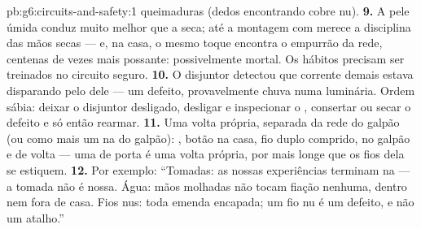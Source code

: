 \begin{solution}{pb:g6:circuits-and-safety:1}
queimaduras (dedos encontrando cobre nu).
\textbf{9.} A pele úmida conduz muito melhor que a seca; até a
montagem com  merece a disciplina das mãos secas --- e, na casa,
o mesmo toque encontra o empurrão da rede, centenas de vezes mais
possante: possivelmente mortal. Os hábitos precisam ser treinados no
circuito seguro.
\textbf{10.} O disjuntor detectou que corrente demais estava
disparando pelo  dele --- um defeito, provavelmente chuva numa
luminária. Ordem sábia: deixar o disjuntor desligado, desligar e
inspecionar o , consertar ou secar o defeito e só então rearmar.
\textbf{11.} Uma volta própria, separada da rede do galpão (ou como
mais um   na  do galpão): , botão na casa,
fio duplo comprido,  no galpão e de volta --- uma 
de porta é uma volta  própria, por mais longe que os fios
dela se estiquem.
\textbf{12.} Por exemplo: ``Tomadas: as nossas experiências terminam
na  --- a tomada não é nossa. Água: mãos molhadas não tocam
fiação nenhuma, dentro nem fora de casa. Fios nus: toda emenda
encapada; um fio nu é um defeito, e não um atalho.''
\end{solution}
